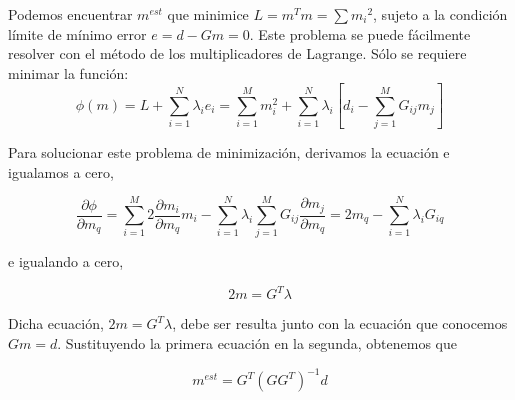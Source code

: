 \documentclass[aspectratio=169]{beamer}
\begin{document}
\begin{frame}
 
{\color{black}Podemos encuentrar $m^{est}$ que minimice $L=m^Tm=\sum{m_i}^2$, sujeto a la condición límite de mínimo error $e = d - Gm = 0$. Este problema se puede fácilmente resolver con el método de los multiplicadores de Lagrange. Sólo se requiere minimar la función:
 \begin{equation}
  \phi(m) = L + \sum_{i=1}^N{\lambda_i e_i} = \sum_{i=1}^M m^2_i + \sum_{i=1}^N{ \lambda_i   \left[ d_i - \sum^M_{j=1} G_{ij}m_j\right]
}
\end{equation}


Para solucionar este problema de minimización, derivamos la ecuación e igualamos a cero,

\begin{equation}
 \frac{\partial\phi}{\partial m_q} = 
 \sum_{i=1}^M 2 \frac{\partial m_i}{\partial m_q} m_i - \sum_{i=1}^N \lambda_i 
 \sum_{j=1}^M {G_{ij} \frac{\partial m_j}{\partial m_q}} = 2m_q - \sum_{i=1}^N{\lambda_i G_{iq}}
\end{equation}

e igualando a cero,

\begin{equation}
 2m =  G^T \lambda
\end{equation}
}
 
\end{frame}

\begin{frame}
 
{\color{black} Dicha ecuación, $2m=G^T\lambda$, debe ser resulta junto con la ecuación que conocemos $Gm = d$. Sustituyendo la primera ecuación en la segunda, obtenemos que 

\begin{equation}
 m^{est} = G^T (GG^T)^{-1} d
\end{equation}
}
 
\end{frame}
\end{document}
